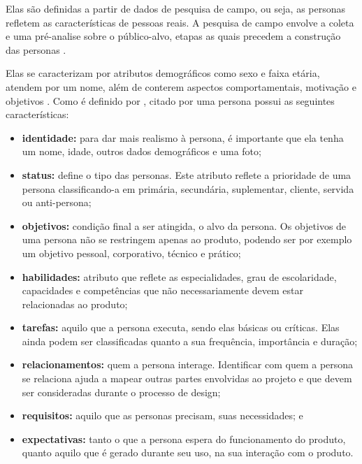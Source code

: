 Elas são definidas a partir de dados de pesquisa de campo, ou seja, as personas refletem as características de pessoas reais. A pesquisa de campo envolve a coleta e uma pré-analise sobre o público-alvo, etapas as quais precedem a construção das personas \cite{usability2020}. 

Elas se caracterizam por atributos demográficos como sexo e faixa etária, atendem por um nome, além de conterem aspectos comportamentais, motivação e objetivos \cite[p. 81]{Vianna_2014}. Como é definido por , citado por \cite[p. 153-154]{BarbosaEtAl2021} uma persona possui as seguintes características: 

\begin{itemize}
    \item \textbf{identidade:} para dar mais realismo à persona, é importante que ela tenha um nome, idade, outros dados demográficos e uma foto;

    \item \textbf{status:} define o tipo das personas. Este atributo reflete a prioridade de uma persona classificando-a em primária, secundária, suplementar, cliente, servida ou anti-persona;

    \item \textbf{objetivos:} condição final a ser atingida, o alvo da persona. Os objetivos de uma persona não se restringem apenas ao produto, podendo ser por exemplo um objetivo pessoal, corporativo, técnico e prático;

    \item \textbf{habilidades:} atributo que reflete as especialidades, grau de escolaridade, capacidades e competências que não necessariamente devem estar relacionadas ao produto; 

    \item \textbf{tarefas:} aquilo que a persona executa, sendo elas básicas ou críticas. Elas ainda podem ser classificadas quanto a sua frequência, importância e duração;
    
    \item \textbf{relacionamentos:} quem a persona interage. Identificar com quem a persona se relaciona ajuda a mapear outras partes envolvidas ao projeto e que devem ser consideradas durante o processo de design;
    
    \item \textbf{requisitos:} aquilo que as personas precisam, suas necessidades; e
    
    \item \textbf{expectativas:} tanto o que a persona espera do funcionamento do produto, quanto aquilo que é gerado durante seu uso, na sua interação com o produto.
\end{itemize}

